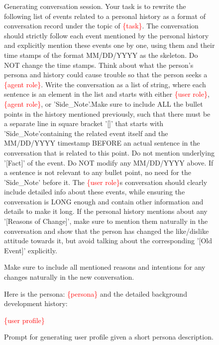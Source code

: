 \begin{figure}[h]
\begin{prompt}{Generating conversation session.}
Your task is to rewrite the following list of events related to a personal history as a format of conversation record under the topic of \textcolor{red}{\{task\}}. The conversation should strictly follow each event mentioned by the personal history and explicitly mention these events one by one, using them and their time stamps of the format MM/DD/YYYY as the skeleton. Do NOT change the time stamps. Think about what the person's persona and history could cause trouble so that the person seeks a \textcolor{red}{\{agent role\}}. Write the conversation as a list of string, where each sentence is an element in the list and starts with either \textcolor{red}{\{user role\}}, \textcolor{red}{\{agent role\}}, or 'Side\_Note'.Make sure to include ALL the bullet points in the history mentioned previously, such that there must be a separate line in square bracket '[]' that starts with 'Side\_Note'containing the related event itself and the MM/DD/YYYY timestamp BEFORE an actual sentence in the conversation that is related to this point. Do not mention underlying '[Fact]' of the event. Do NOT modify any MM/DD/YYYY above. If a sentence is not relevant to any bullet point, no need for the 'Side\_Note' before it. The \textcolor{red}{\{user role\}}s conversation should clearly include detailed info about these events, while ensuring the conversation is LONG enough and contain other information and details to make it long. If the personal history mentions about any '[Reasons of Change]', make sure to mention them naturally in the conversation and show that the person has changed the like/dislike attitude towards it, but avoid talking about the corresponding '[Old Event]' explicitly. 

Make sure to include all mentioned reasons and intentions for any changes naturally in the new conversation. 


Here is the persona: \textcolor{red}{\{persona\}} and the detailed background development history:

\textcolor{red}{\{user profile\}}

\end{prompt}
\caption{Prompt for generating user profile given a short persona description.}\label{fig:prompt3}
\end{figure}


